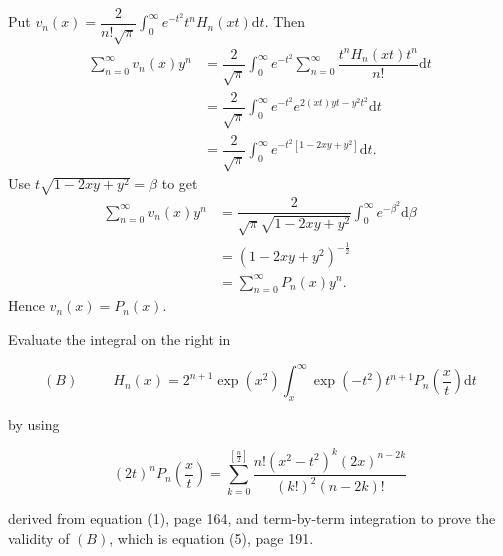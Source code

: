 \begin{solution}
Put $v_n(x) = \dfrac{2}{n! \sqrt{\pi}} \displaystyle\int_0^{\infty} e^{-t^2} t^n H_n(xt) \mathrm{d}t.$
Then
$$\begin{array}{ll}
\displaystyle\sum_{n=0}^{\infty} v_n(x)y^n &= \dfrac{2}{\sqrt{\pi}} \displaystyle\int_0^{\infty} e^{-t^2} \displaystyle\sum_{n=0}^{\infty} \dfrac{t^n H_n(xt) t^n}{n!} \mathrm{d}t \\
&= \dfrac{2}{\sqrt{\pi}} \displaystyle\int_0^{\infty} e^{-t^2} e^{2(xt)yt-y^2t^2}\mathrm{d}t \\
&= \dfrac{2}{\sqrt{\pi}} \displaystyle\int_0^{\infty} e^{-t^2[1-2xy+y^2]} \mathrm{d}t.
\end{array}$$
Use $t \sqrt{1-2xy+y^2}=\beta$ to get
$$\begin{array}{ll}
\displaystyle\sum_{n=0}^{\infty} v_n(x) y^n &= \dfrac{2}{\sqrt{\pi}\sqrt{1-2xy+y^2}} \displaystyle\int_0^{\infty} e^{-\beta^2} \mathrm{d} \beta \\
&= (1-2xy+y^2)^{-\frac{1}{2}} \\
&= \displaystyle\sum_{n=0}^{\infty} P_n(x) y^n.
\end{array}$$
Hence $v_n(x) = P_n(x).$
\end{solution}
\begin{problem}\label{problem6chapter11}
Evaluate the integral on the right in 

$$(B) \hspace{30pt} H_n(x) = 2^{n+1} \exp(x^2) \displaystyle\int_x^{\infty} \exp(-t^2) t^{n+1} P_n \left( \dfrac{x}{t} \right) \mathrm{d}t$$

by using

$$(2t)^n P_n \left( \dfrac{x}{t} \right) = \displaystyle\sum_{k=0}^{[\frac{n}{2}]} \dfrac{n! (x^2-t^2)^k (2x)^{n-2k}}{(k!)^2 (n-2k)!}$$

derived from equation (1), page 164, and term-by-term integration to prove the validity of $(B)$, which is equation (5), page 191.
\end{problem}
